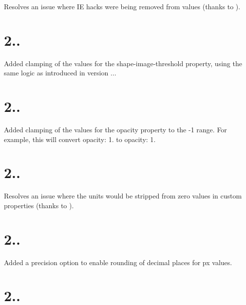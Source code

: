 
\begin{DoxyItemize}
\item Resolves an issue where IE hacks were being removed from {} values (thanks to ).
\end{DoxyItemize}

\section*{2..}


\begin{DoxyItemize}
\item Added clamping of the values for the {\ttfamily shape-\/image-\/threshold} property, using the same logic as introduced in version {..}.
\end{DoxyItemize}

\section*{2..}


\begin{DoxyItemize}
\item Added clamping of the values for the {\ttfamily opacity} property to the {-\/1} range. For example, this will convert {\ttfamily opacity\+: 1.} to {\ttfamily opacity\+: 1}.
\end{DoxyItemize}

\section*{2..}


\begin{DoxyItemize}
\item Resolves an issue where the units would be stripped from zero values in custom properties (thanks to ).
\end{DoxyItemize}

\section*{2..}


\begin{DoxyItemize}
\item Added a {\ttfamily precision} option to enable rounding of decimal places for {\ttfamily px} values.
\end{DoxyItemize}

\section*{2..}


